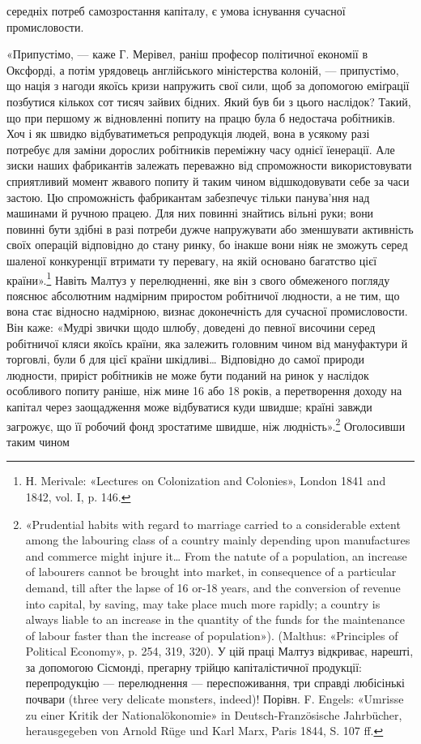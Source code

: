 \parcont{}  %
середніх потреб самозростання капіталу, є умова існування сучасної
промисловости.

«Припустімо, — каже Г. Мерівел, раніш професор політичної
економії в Оксфорді, а потім урядовець англійського міністерства
колоній, — припустімо, що нація з нагоди якоїсь кризи напружить
свої сили, щоб за допомогою еміґрації позбутися кількох сот
тисяч зайвих бідних. Який був би з цього наслідок? Такий, що
при першому ж відновленні попиту на працю була б недостача
робітників. Хоч і як швидко відбуватиметься репродукція людей,
вона в усякому разі потребує для заміни дорослих робітників
переміжну часу однієї їенерації. Але зиски наших фабрикантів
залежать переважно від спроможности використовувати сприятливий
момент жвавого попиту й таким чином відшкодовувати
себе за часи застою. Цю спроможність фабрикантам забезпечує
тільки панува'ння над машинами й ручною працею. Для них
повинні знайтись вільні руки; вони повинні бути здібні в разі
потреби дужче напружувати або зменшувати активність своїх
операцій відповідно до стану ринку, бо інакше вони ніяк не зможуть
серед шаленої конкуренції втримати ту перевагу, на якій
основано багатство цієї країни».\footnote{
Н. Merivale: «Lectures on Colonization and Colonies», London 1841
and 1842, vol. I, p. 146.
} Навіть Малтуз у перелюдненні,
яке він з свого обмеженого погляду пояснює абсолютним
надмірним приростом робітничої людности, а не тим, що вона
стає відносно надмірною, визнає доконечність для сучасної промисловости.
Він каже: «Мудрі звички щодо шлюбу, доведені
до певної височини серед робітничої кляси якоїсь країни, яка
залежить головним чином від мануфактури й торговлі, були б
для цієї країни шкідливі\dots{} Відповідно до самої природи людности,
приріст робітників не може бути поданий на ринок у наслідок
особливого попиту раніше, ніж мине 16 або 18 років, а перетворення
доходу на капітал через заощадження може відбуватися
куди швидше; країні завжди загрожує, що її робочий фонд зростатиме
швидше, ніж людність».\footnote{
«Prudential habits with regard to marriage carried to a considerable
extent among the labouring class of a country mainly depending upon manufactures
and commerce might injure it\dots{} From the natute of a population,
an increase of labourers cannot be brought into market, in consequence
of a particular demand, till after the lapse of 16 or-18 years, and the conversion
of revenue into capital, by saving, may take place much more rapidly;
a country is always liable to an increase in the quantity of the funds
for the maintenance of labour faster than the increase of population»).
(Malthus: «Principles of Political Economy», p. 254, 319, 320). У цій праці
Малтуз відкриває, нарешті, за допомогою Сісмонді, прегарну трійцю капіталістичної
продукції: перепродукцію — перелюднення — переспоживання,
три справді любісінькі почвари (three very delicate monsters, indeed)!
Порівн. F. Engels: «Umrisse zu einer Kritik der Nationalökonomie» in
Deutsch-Französische Jahrbücher, herausgegeben von Arnold Rüge
und Karl Marx, Paris 1844, S. 107 ff.
} Оголосивши таким чином
